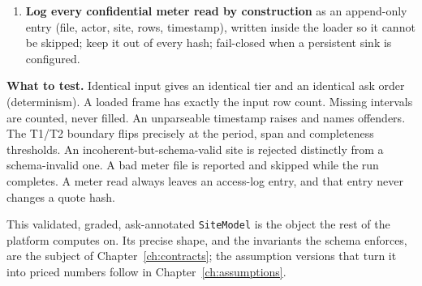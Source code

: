 \begin{rebuild}
\begin{enumerate}
  \item \textbf{Log every confidential meter read by construction} as an append-only entry (file, actor, site, rows, timestamp), written inside the loader so it cannot be skipped; keep it out of every hash; fail-closed when a persistent sink is configured.
\end{enumerate}
\textbf{What to test.} Identical input gives an identical tier and an identical ask order (determinism). A loaded frame has exactly the input row count. Missing intervals are counted, never filled. An unparseable timestamp raises and names offenders. The T1/T2 boundary flips precisely at the period, span and completeness thresholds. An incoherent-but-schema-valid site is rejected distinctly from a schema-invalid one. A bad meter file is reported and skipped while the run completes. A meter read always leaves an access-log entry, and that entry never changes a quote hash.
\end{rebuild}

This validated, graded, ask-annotated \texttt{SiteModel} is the object the rest of the platform computes on. Its precise shape, and the invariants the schema enforces, are the subject of Chapter~\ref{ch:contracts}; the assumption versions that turn it into priced numbers follow in Chapter~\ref{ch:assumptions}.
